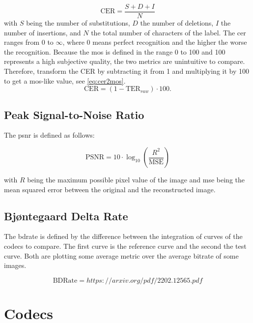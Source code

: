 \begin{equation}
    \text{CER} = \frac{S + D + I}{N}
    \label{eq:cer}
\end{equation}
with \(S\) being the number of substitutions, \(D\) the number of deletions, \(I\) the number of insertions, and \(N\) the total number of characters of the label.
The \gls{cer} ranges from 0 to $\infty$, where 0 means perfect recognition and the higher the worse the recognition.
Because the \gls{mos} is defined in the range 0 to 100 and 100 represents a high subjective quality, the two metrics are unintuitive to compare.
Therefore, transform the CER by subtracting it from 1 and multiplying it by 100 to get a \gls{mos}-like value, see \autoref{eq:cer2mos}.
\begin{equation}
    \text{CER} = (1 - \text{TER}_{raw}) \cdot 100.
    \label{eq:cer2mos}
\end{equation}

\subsection{Peak Signal-to-Noise Ratio}
\label{subsec:psnr}

The \gls{psnr} is defined as follows:

\begin{equation}
    \text{PSNR} = 10 \cdot \log_{10} \left( \frac{R^2}{\text{MSE}} \right)
    \label{eq:psnr}
\end{equation}

with \(R\) being the maximum possible pixel value of the image and \gls{mse} being the mean squared error between the original and the reconstructed image.

\subsection{Bjøntegaard Delta Rate}
\label{subsec:bdrate}

The \gls{bdrate} is defined by the difference between the integration of curves of the codecs to compare. The first curve is the reference curve and the second the test curve. Both are plotting some average metric over the average bitrate of some images.

\begin{equation}
    \text{BDRate} = https://arxiv.org/pdf/2202.12565.pdf
    \label{eq:bdrate}
\end{equation}

\section{Codecs}
\label{sec:codecs}

